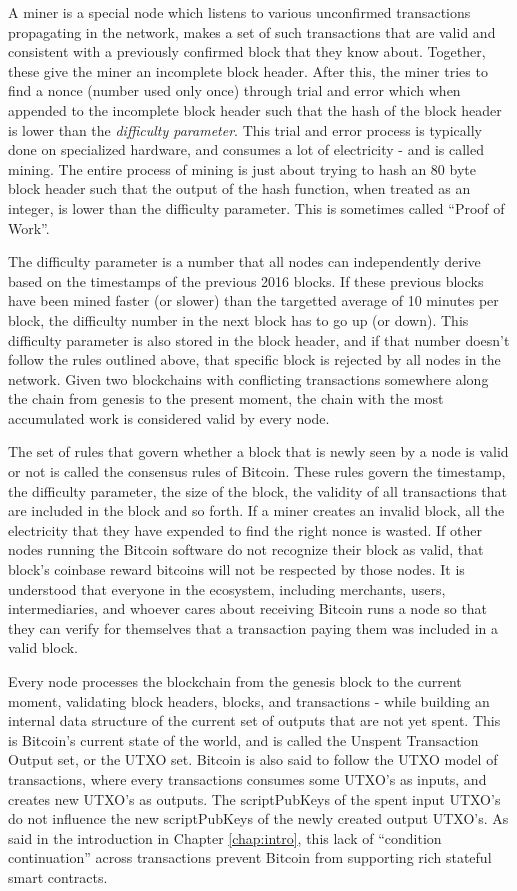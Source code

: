 A miner is a special node which listens to various unconfirmed transactions propagating in the network, makes a set of such transactions that are valid and consistent with a previously confirmed block that they know about. Together, these give the miner an incomplete block header. After this, the miner tries to find a nonce (number used only once) through trial and error which when appended to the incomplete block header such that the hash of the block header is lower than the \textit{difficulty parameter}. This trial and error process is typically done on specialized hardware, and consumes a lot of electricity - and is called mining. The entire process of mining is just about trying to hash an 80 byte block header such that the output of the hash function, when treated as an integer, is lower than the difficulty parameter. This is sometimes called ``Proof of Work''.

The difficulty parameter is a number that all nodes can independently derive based on the timestamps of the previous 2016 blocks. If these previous blocks have been mined faster (or slower) than the targetted average of 10 minutes per block, the difficulty number in the next block has to go up (or down). This difficulty parameter is also stored in the block header, and if that number doesn't follow the rules outlined above, that specific block is rejected by all nodes in the network. Given two blockchains with conflicting transactions somewhere along the chain from genesis to the present moment, the chain with the most accumulated work is considered valid by every node.

The set of rules that govern whether a block that is newly seen by a node is valid or not is called the consensus rules of Bitcoin. These rules govern the timestamp, the difficulty parameter, the size of the block, the validity of all transactions that are included in the block and so forth. If a miner creates an invalid block, all the electricity that they have expended to find the right nonce is wasted. If other nodes running the Bitcoin software do not recognize their block as valid, that block's coinbase reward bitcoins will not be respected by those nodes. It is understood that everyone in the ecosystem, including merchants, users, intermediaries, and whoever cares about receiving Bitcoin runs a node so that they can verify for themselves that a transaction paying them was included in a valid block.

Every node processes the blockchain from the genesis block to the current moment, validating block headers, blocks, and transactions - while building an internal data structure of the current set of outputs that are not yet spent. This is Bitcoin's current state of the world, and is called the Unspent Transaction Output set, or the UTXO set. Bitcoin is also said to follow the UTXO model of transactions, where every transactions consumes some UTXO's as inputs, and creates new UTXO's as outputs. The scriptPubKeys of the spent input UTXO's do not influence the new scriptPubKeys of the newly created output UTXO's. As said in the introduction in Chapter \ref{chap:intro}, this lack of ``condition continuation'' across transactions prevent Bitcoin from supporting rich stateful smart contracts.

